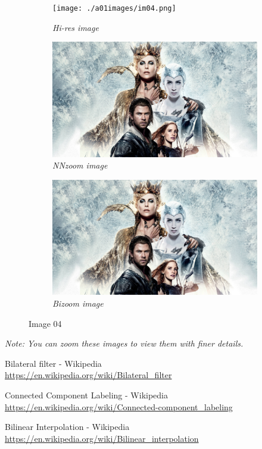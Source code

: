 \documentclass[11pt, a4paper]{article}
\begin{document}
\begin{figure}[H]
	\centering
	\begin{subfigure}[b]{0.3\textwidth}
		\centering
		\texttt{[image: ./a01images/im04.png]}
		\caption{{\small \textit{Hi-res image}}}
	\end{subfigure}
	\hfill
	\begin{subfigure}[b]{0.3\textwidth}
		\centering
		\includegraphics[width=\textwidth]{./Outputs/nnzoomfloor04.jpg}
		\caption{{\small \textit{NNzoom image}}}
	\end{subfigure}
	\hfill
	\begin{subfigure}[b]{0.3\textwidth}
		\centering
		\includegraphics[width=\textwidth]{./Outputs/bizoom04.jpg}
		\caption{{\small \textit{Bizoom image}}}
	\end{subfigure}
	\caption{Image 04}
\end{figure}
\textit{Note: You can zoom these images to view them with finer details.}

\begin{thebibliography}{AA}
Bilateral filter - Wikipedia\\
\url{https://en.wikipedia.org/wiki/Bilateral_filter}

Connected Component Labeling - Wikipedia\\
\url{https://en.wikipedia.org/wiki/Connected-component_labeling}

Bilinear Interpolation - Wikipedia\\
\url{https://en.wikipedia.org/wiki/Bilinear_interpolation}

\nocite{Fwiki, CCwiki, Biwiki}
\end{thebibliography}
\end{document}
